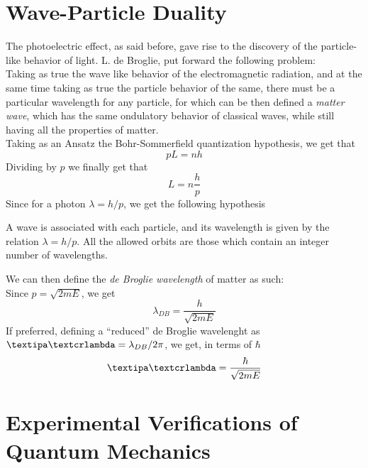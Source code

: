 \documentclass[../qm.tex]{subfiles}
\begin{document}
	\section{Wave-Particle Duality}
	The photoelectric effect, as said before, gave rise to the discovery of the particle-like behavior of light. L. de Broglie, put forward the following problem:\\
	Taking as true the wave like behavior of the electromagnetic radiation, and at the same time taking as true the particle behavior of the same, there must be a particular wavelength for any particle, for which can be then defined a \textit{matter wave}, which has the same ondulatory behavior of classical waves, while still having all the properties of matter.\\
	Taking as an Ansatz the Bohr-Sommerfield quantization hypothesis, we get that
	\begin{equation*}
		pL=nh
	\end{equation*}
	Dividing by $p$ we finally get that
	\begin{equation*}
		L=n\frac{h}{p}
	\end{equation*}
	Since for a photon $\lambda=h/p$, we get the following hypothesis
	\begin{hyp}
		A wave is associated with each particle, and its wavelength is given by the relation $\lambda=h/p$. All the allowed orbits are those which contain an integer number of wavelengths.
	\end{hyp}
	We can then define the \textit{de Broglie wavelength} of matter as such:\\
	Since $p=\sqrt{2mE}$, we get
	\begin{equation}
		\lambda_{DB}=\frac{h}{\sqrt{2mE}}
		\label{eq:debrogliewavelength}
	\end{equation}
	If preferred, defining a ``reduced'' de Broglie wavelenght as $\lbar=\lambda_{DB}/2\pi$, we get, in terms of $\hbar$
	\begin{equation*}
		\lbar=\frac{\hbar}{\sqrt{2mE}}
	\end{equation*}
	\section{Experimental Verifications of Quantum Mechanics}
\end{document}
